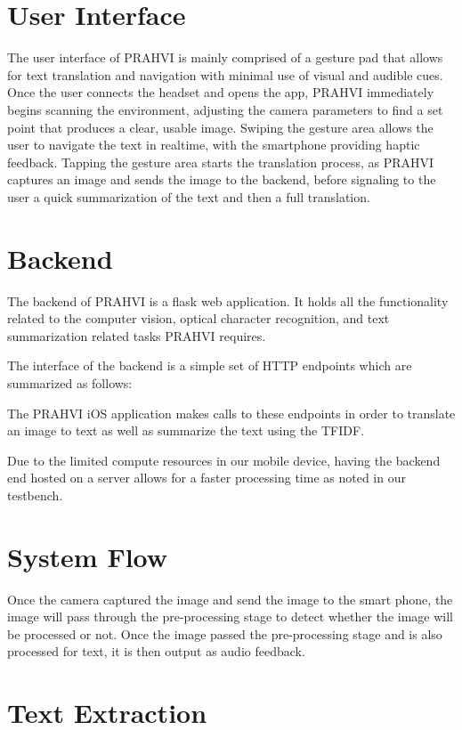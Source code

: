 \section{User Interface}
The user interface of PRAHVI is mainly comprised of a gesture pad that allows for text translation and navigation with minimal use of visual and audible cues. Once the user connects the headset and opens the app, PRAHVI immediately begins scanning the environment, adjusting the camera parameters to find a set point that produces a clear, usable image. Swiping the gesture area allows the user to navigate the text in realtime, with the smartphone providing haptic feedback. Tapping the gesture area starts the translation process, as PRAHVI captures an image and sends the image to the backend, before signaling to the user a quick summarization of the text and then a full translation.

\section{Backend}
The backend of PRAHVI is a flask web application. It holds all the functionality related to the computer vision, optical character recognition, and text summarization related tasks PRAHVI requires.

The interface of the backend is a simple set of HTTP endpoints which are summarized as follows:


The PRAHVI iOS application makes calls to these endpoints in order to translate an image to text as well as summarize the text using the TFIDF.

Due to the limited compute resources in our mobile device, having the backend end hosted on a server allows for a faster processing time as noted in our testbench.


\section{System Flow}
Once the camera captured the image and send the image to the smart phone, the image will pass through the pre-processing stage to detect whether the image will be processed or not. Once the image passed the pre-processing stage and is also processed for text, it is then output as audio feedback.

\section{Text Extraction}
